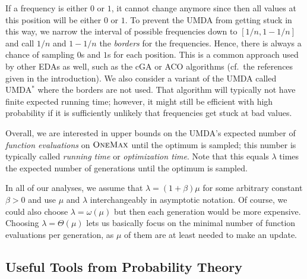 \documentclass[11pt, a4paper]{article}
\newcommand*{\om}{\textsc{OneMax}\xspace}
\newcommand{\umdastar}{UMDA$^*$\xspace}
\newcommand{\umda}{UMDA\xspace}
\begin{document}
If a frequency is either $0$ or $1$, it cannot change anymore since then all values at this position will be 
either $0$ or $1$. To prevent the \umda from getting stuck in this way, we narrow the interval of possible 
frequencies down to $[1/n, 1 - 1/n]$ and call $1/n$ and $1-1/n$ the \emph{borders} for the frequencies. Hence, 
there is always a chance of sampling $0$s and $1$s for each position. This is a common approach used by other EDAs 
as well, such as the cGA or ACO algorithms (cf.\ the references given in the introduction). We also consider a variant of the \umda 
called \umdastar where the borders 
are not used. That algorithm will typically not have finite expected running time; however, it might still be efficient 
with high probability if it is sufficiently unlikely that frequencies get stuck at bad values.

Overall, we are interested in upper bounds on the \umda's expected number of \emph{function evaluations} on $\om$ 
until the optimum is sampled; this number is typically called \emph{running time} or \emph{optimization time}. 
Note that this equals $\lambda$ times the expected number of generations until the optimum is sampled.

In all of our analyses, we  assume that $\lambda = (1 + \beta)\mu$ for some arbitrary constant $\beta > 0$ and 
use $\mu$ and $\lambda$ interchangeably in asymptotic notation. Of course, we 
could also choose $\lambda = \omega(\mu)$ but then each generation would be  more expensive. Choosing $\lambda = \Theta(\mu)$ 
lets us basically focus on the minimal number of function evaluations per generation, as $\mu$ of them are at least 
needed to make an update.


\subsection{Useful Tools from Probability Theory}
\end{document}
